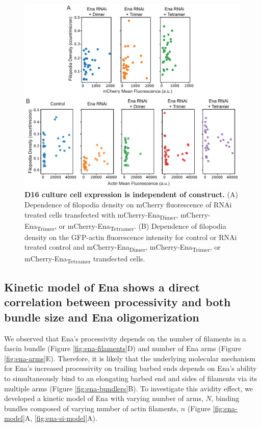 \begin{figure}
\centering
\includegraphics[width=6in]{img/ch02/Supp_Figure_3_PNAS.pdf}
\caption[D16 culture cell expression is independent of construct.]{\textbf{D16 culture cell expression is independent of construct.} (A) Dependence of filopodia density on mCherry fluorescence of RNAi treated cells transfected with mCherry-Ena\textsubscript{Dimer}, mCherry-Ena\textsubscript{Trimer}, or mCherry-Ena\textsubscript{Tetramer}. (B) Dependence of filopodia density on the GFP-actin fluorescence intensity for control or RNAi treated control and mCherry-Ena\textsubscript{Dimer}, mCherry-Ena\textsubscript{Trimer}, or mCherry-Ena\textsubscript{Tetramer} transfected cells.}
\label{fig:ena-expression}
\end{figure}

\subsection{Kinetic model of Ena shows a direct correlation between processivity and both bundle size and Ena oligomerization}\label{ena-model}

We observed that Ena's processivity depends on the number of filaments in a fascin bundle (Figure \ref{fig:ena-filaments}D) and number of Ena arms (Figure \ref{fig:ena-arms}E). Therefore, it is likely that the underlying molecular mechanism for Ena's increased processivity on trailing barbed ends depends on Ena's ability to simultaneously bind to an elongating barbed end and sides of filaments via its multiple arms (Figure \ref{fig:ena-bundlers}B). To investigate this avidity effect, we developed a kinetic model of Ena with varying number of arms, $N$, binding bundles composed of varying number of actin filaments, $n$ (Figure \ref{fig:ena-model}A, \ref{fig:ena-si-model}A). 

